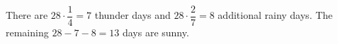 There are $28\cdot\dfrac{1}{4}=7$ thunder days and $28\cdot\dfrac{2}{7}=8$ additional rainy days. The remaining $28-7-8=\boxed{13}$ days are sunny.
